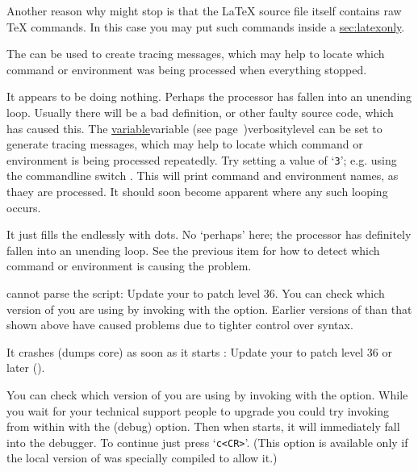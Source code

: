 \begin{htmllist}
Another reason why \latextohtml{} might stop is that the \LaTeX{} source
file itself contains raw \TeX{} commands. In this case you may 
put such commands inside a 
\hyperref{environment}{environment (see Section }{)}{sec:latexonly}.

\begin{changebar}
The   can be used 
to create tracing messages, which may help to locate which command 
or environment was being processed when everything stopped.
\end{changebar}

\begin{changebar}
\item [It appears to be doing nothing.\label{looping}]
Perhaps the processor has fallen into an unending loop.
Usually there will be a bad definition, or other faulty source code,
which has caused this.
The  \hyperref[page]{variable}{variable (see page~}{)}{verbositylevel}%
can be set to generate tracing messages, which may help to locate which command 
or environment is being processed repeatedly.
Try setting a value of `\texttt{3}'; e.g. using the commandline switch .
This will print command and environment names, as thaey are processed.
It should soon become apparent where any such looping occurs.

\item [It just fills the endlessly with dots.]
No `perhaps' here; the processor has definitely fallen into an unending loop.
See the previous item for how to detect which command or environment
is causing the problem.
\end{changebar}

\item [\Perl{} cannot parse the \fn{latex2html} script: ]
Update your \Perl{} to patch level 36. You can check which version of
\Perl{} you are using by invoking \Perl{} with the  option.
Earlier versions of \Perl{} than that shown above
have caused problems due to tighter control over syntax.

\item [It crashes (dumps core) as soon as it starts \label{perl}: ]
Update your  to patch level 36 or later ().

You can check which version of
\Perl{} you are using by invoking \Perl{} with the  option.
\html{\\}
While you wait for your technical support people to upgrade \Perl{}
you could try invoking \Perl{} from within \latextohtml{} with 
the  (debug) option. Then when \latextohtml{} starts, it will
immediately fall into the \Perl{} debugger. To continue just press 
`\texttt{c<CR>}'. (This option is available only if the 
local version of \Perl{} was specially compiled to allow it.)



\end{htmllist}
